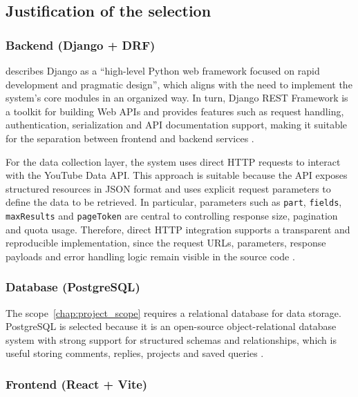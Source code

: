 \subsection{Justification of the selection}

\subsubsection{Backend (Django + DRF)}

\textcite{django_framework} describes Django as a \enquote{high-level Python web framework focused on rapid development and pragmatic design}, which aligns with the need to implement the system's core modules in an organized way. In turn, Django REST Framework is a toolkit for building Web APIs and provides features such as request handling, authentication, serialization and API documentation support, making it suitable for the separation between frontend and backend services \autocite{drf_framework,drf_requests,drf_authentication,drf_documenting_api}.

For the data collection layer, the system uses direct HTTP requests to interact with the YouTube Data API. This approach is suitable because the API exposes structured resources in JSON format and uses explicit request parameters to define the data to be retrieved. In particular, parameters such as \texttt{part}, \texttt{fields}, \texttt{maxResults} and \texttt{pageToken} are central to controlling response size, pagination and quota usage. Therefore, direct HTTP integration supports a transparent and reproducible implementation, since the request URLs, parameters, response payloads and error handling logic remain visible in the source code \autocite{youtube_data_api_docs}.

\subsubsection{Database (PostgreSQL)}

The scope~\ref{chap:project_scope} requires a relational database for data storage. PostgreSQL is selected because it is an open-source object-relational database system with strong support for structured schemas and relationships, which is useful storing comments, replies, projects and saved queries \autocite{postgresql_about}.

\subsubsection{Frontend (React + Vite)}

